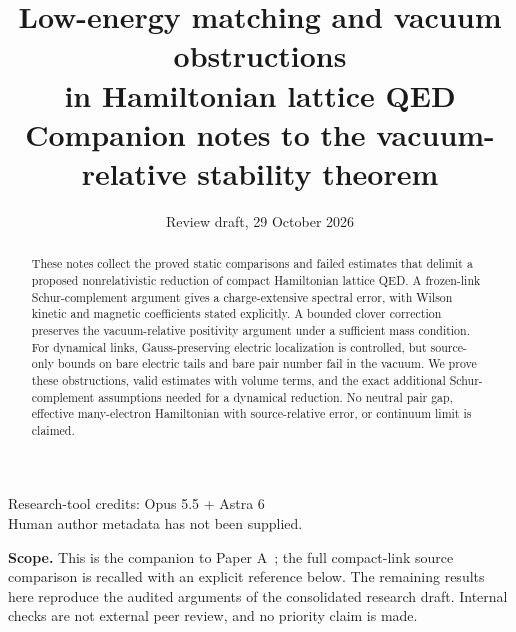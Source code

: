 \documentclass[11pt,letterpaper]{article}
\title{\textbf{Low-energy matching and vacuum obstructions\\
in Hamiltonian lattice QED}\\[0.4em]
\large Companion notes to the vacuum-relative stability theorem}
\author{}
\date{Review draft, 29 October 2026}
\numberwithin{equation}{section}
\theoremstyle{remark}
\begin{document}
\maketitle
\begin{center}\small
Research-tool credits: Opus 5.5 + Astra 6\\
Human author metadata has not been supplied.
\end{center}
\begin{abstract}
These notes collect the proved static comparisons and failed estimates
that delimit a proposed nonrelativistic reduction of compact Hamiltonian
lattice QED. A frozen-link Schur-complement argument gives a
charge-extensive spectral error, with Wilson kinetic and magnetic
coefficients stated explicitly. A bounded clover correction preserves
the vacuum-relative positivity argument under a sufficient mass condition.
For dynamical links, Gauss-preserving electric localization is controlled,
but source-only bounds on bare electric tails and bare pair number
fail in the vacuum. We prove these obstructions, valid estimates with
volume terms, and the exact additional Schur-complement assumptions
needed for a dynamical reduction. No neutral pair gap, effective
many-electron Hamiltonian with source-relative error, or continuum
limit is claimed.
\end{abstract}
\noindent\textbf{Scope.}
This is the companion to Paper A~\cite{PaperA}; the full compact-link
source comparison is recalled with an explicit reference below.
The remaining results here reproduce the audited arguments of the
consolidated research draft. Internal checks are not external peer review,
and no priority claim is made.
\tableofcontents






\end{document}
